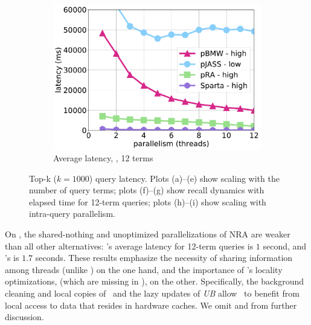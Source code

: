 {{\begin{figure}[tbh]
\begin{subfigure}{0.325\textwidth}
      \includegraphics[width=\textwidth]{figures/latency_12terms_cluewebX10.pdf}
	  \caption{Average latency, \cwten, 12 terms}
	  	\label{fig:threads-scaling-cw10}
      \end{subfigure}
      
\caption{Top-k ($k=1000$) query latency. Plots (a)--(e) show scaling with the number of query terms; plots (f)--(g) show recall dynamics with elapsed time for 12-term queries; plots (h)--(i) show scaling with intra-query parallelism.  
}
\end{figure}

%






On \cw, 
the shared-nothing and unoptimized parallelizations of NRA are weaker than all other alternatives:
\pNRA's  average latency for 12-term queries is $1$ second, and \sNRA's is $1.7$ seconds. 
These results emphasize the necessity of sharing information among threads (unlike \sNRA) on the one hand,
and the importance of \alg's locality optimizations, (which are missing in \pNRA), on the other. 
Specifically, the background cleaning and local copies of \DMap\ and the lazy updates of \emph{UB} allow \alg\ to benefit from 
local access to data that resides in hardware caches. 
We omit \pNRA\/ and \sNRA\/ from further discussion. 


}}
